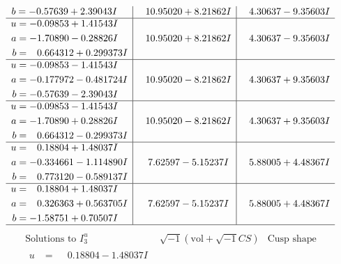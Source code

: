 \documentclass[1p]{elsarticle_modified}
\theoremstyle{definition}
\newcommand{\I}{\sqrt{-1}}
\begin{document}
$$\begin{array}{c|c|c}
\begin{aligned}
b &= -0.57639 + 2.39043 I\end{aligned}
 & \phantom{-}10.95020 + 8.21862 I & \phantom{-}4.30637 - 9.35603 I \\ \hline\begin{aligned}
u &= -0.09853 + 1.41543 I \\
a &= -1.70890 - 0.28826 I \\
b &= \phantom{-}0.664312 + 0.299373 I\end{aligned}
 & \phantom{-}10.95020 + 8.21862 I & \phantom{-}4.30637 - 9.35603 I \\ \hline\begin{aligned}
u &= -0.09853 - 1.41543 I \\
a &= -0.177972 - 0.481724 I \\
b &= -0.57639 - 2.39043 I\end{aligned}
 & \phantom{-}10.95020 - 8.21862 I & \phantom{-}4.30637 + 9.35603 I \\ \hline\begin{aligned}
u &= -0.09853 - 1.41543 I \\
a &= -1.70890 + 0.28826 I \\
b &= \phantom{-}0.664312 - 0.299373 I\end{aligned}
 & \phantom{-}10.95020 - 8.21862 I & \phantom{-}4.30637 + 9.35603 I \\ \hline\begin{aligned}
u &= \phantom{-}0.18804 + 1.48037 I \\
a &= -0.334661 - 1.114890 I \\
b &= \phantom{-}0.773120 - 0.589137 I\end{aligned}
 & \phantom{-}7.62597 - 5.15237 I & \phantom{-}5.88005 + 4.48367 I \\ \hline\begin{aligned}
u &= \phantom{-}0.18804 + 1.48037 I \\
a &= \phantom{-}0.326363 + 0.563705 I \\
b &= -1.58751 + 0.70507 I\end{aligned}
 & \phantom{-}7.62597 - 5.15237 I & \phantom{-}5.88005 + 4.48367 I\\
 \hline 
 \end{array}$$\newpage$$\begin{array}{c|c|c}  
\text{Solutions to }I^u_{3}& \I (\text{vol} + \sqrt{-1}CS) & \text{Cusp shape}\\
 \hline 
\begin{aligned}
u &= \phantom{-}0.18804 - 1.48037 I \\

\end{aligned}
\end{array}$$
\end{document}
